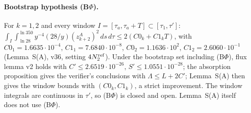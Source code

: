 \paragraph{Bootstrap hypothesis (B$\Phi$).} For $k=1,2$ and every window $I=[\tau_a,\tau_a+T]\subset[\tau_1,\tau']$:
$\int_I\int_{\ln28}^{\ln350}y^{-4}(28/y)(z^A_{k+2})^2\,ds\,d\tau\le2(C0_k+C1_kT)$, with $C0_1=1.6635\cdot10^{-4}$, $C1_1=7.6840\cdot10^{-8}$, $C0_2=1.1636\cdot10^{2}$, $C1_2=2.6060\cdot10^{-1}$ (Lemma~S(A), v36, setting $4N_2^{\rm ref}$).
Under the bootstrap set including (B$\Phi$), flux lemma v2 holds with $C'\le2.6519\cdot10^{-26}$, $S'\le1.0551\cdot10^{-28}$; the absorption proposition gives the verifier's conclusions with $\Lambda\le L+2C'$; Lemma~S(A) then gives the window bounds with $(C0_k,C1_k)$, a strict improvement. The window integrals are continuous in $\tau'$, so (B$\Phi$) is closed and open. Lemma~S(A) itself does not use (B$\Phi$).
